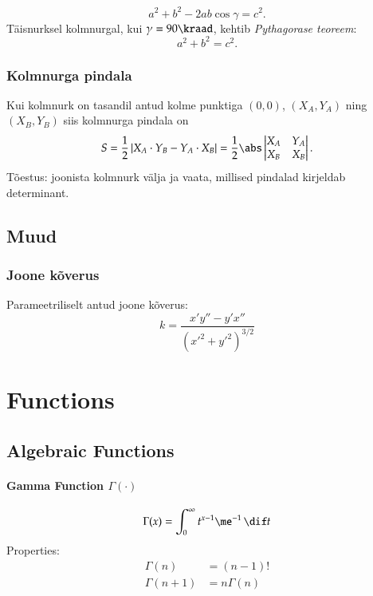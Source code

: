 \documentclass[a4paper]{article}
\numberwithin{equation}{subsection}
\begin{document}
\begin{equation}
a^2 + b^2 - 2ab \cos \gamma = c^2.
\end{equation}
Täisnurksel kolmnurgal, kui $\gamma = 90\kraad$, kehtib
\emph{Pythagorase teoreem}:
\begin{equation}
a^2 + b^2 = c^2.
\end{equation}

\subsubsection{Kolmnurga pindala}
Kui kolmnurk on tasandil antud kolme punktiga $(0,0)$, $(X_A, Y_A)$
ning $(X_B, Y_B)$ siis kolmnurga pindala on
\begin{equation}
S = \frac{1}{2} \left| X_A \cdot Y_B - Y_A \cdot X_B \right| =
\frac{1}{2} \abs
  \begin{vmatrix}
  X_A   & Y_A \\
  X_B   & X_B
  \end{vmatrix}.
\end{equation}
Tõestus: joonista kolmnurk välja ja vaata, millised pindalad kirjeldab
determinant.


\subsection{Muud}
\label{sec:geomeetria_muud}

\subsubsection{Joone kõverus}

Parameetriliselt antud joone kõverus:
\begin{equation}
  \label{eq:param_joone_kqverus}
  k = \frac{x'y'' - y'x''}{({x'}^2 + {y'}^2)^{3/2}}
\end{equation}


\newpage

\section{Functions}
\label{sec:functions}

\subsection{Algebraic Functions}

\paragraph{Gamma Function $\Gamma(\cdot)$}
\begin{equation}
  \Gamma(x) = \int_{0}^{\infty} t^{x-1} \me^{-1}\,\dif t
\end{equation}
Properties:
\begin{align}
  \Gamma(n) &= (n-1)!
  \\
  \Gamma(n+1) &= n \Gamma(n)
\end{align}
\end{document}
